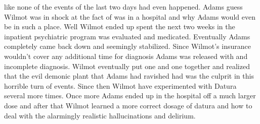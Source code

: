 \documentclass[12pt]{book}
\begin{document}
like none of the events of the last two days had even happened. Adams guess Wilmot was in shock at the fact of was in a hospital and why Adams would even be in such a place. Well Wilmot ended up spent the next two weeks in the inpatient psychiatric program was evaluated and medicated. Eventually Adams completely came back down and seemingly stabilized. Since Wilmot's insurance wouldn't cover any additional time for diagnosis Adams was released with and incomplete diagnosis. Wilmot eventually put one and one together and realized that the evil demonic plant that Adams had ravished had was the culprit in this horrible turn of events. Since then Wilmot have experimented with Datura several more times. Once more Adams ended up in the hospital off a much larger dose and after that Wilmot learned a more correct dosage of datura and how to deal with the alarmingly realistic hallucinations and delirium.
\end{document}
